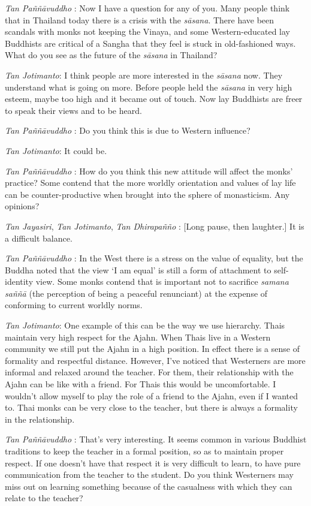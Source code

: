 \emph{Tan Paññāvuddho} : Now I have a question for any of you. Many
people think that in Thailand today there is a crisis with the
\emph{sāsana}. There have been scandals with monks not keeping the
Vinaya, and some Western-educated lay Buddhists are critical of a Sangha
that they feel is stuck in old-fashioned ways. What do you see as the
future of the \emph{sāsana} in Thailand?

\emph{Tan Jotimanto}: I think people are more interested in the
\emph{sāsana} now. They understand what is going on more. Before people
held the \emph{sāsana} in very high esteem, maybe too high and it became
out of touch. Now lay Buddhists are freer to speak their views and to be
heard.

\emph{Tan Paññāvuddho} : Do you think this is due to Western influence?

\emph{Tan Jotimanto}: It could be.

\emph{Tan Paññāvuddho} : How do you think this new attitude will affect
the monks' practice? Some contend that the more worldly orientation and
values of lay life can be counter-productive when brought into the
sphere of monasticism. Any opinions?

\emph{Tan Jayasiri}, \emph{Tan Jotimanto}, \emph{Tan Dhirapañño} :
{[}Long pause, then laughter.{]} It is a difficult balance.

\emph{Tan Paññāvuddho} : In the West there is a stress on the value of
equality, but the Buddha noted that the view `I am equal' is still a
form of attachment to self-identity view. Some monks contend that is
important not to sacrifice \emph{samana saññā} (the perception of being
a peaceful renunciant) at the expense of conforming to current worldly
norms.

\emph{Tan Jotimanto}: One example of this can be the way we use
hierarchy. Thais maintain very high respect for the Ajahn. When Thais
live in a Western community we still put the Ajahn in a high position.
In effect there is a sense of formality and respectful distance.
However, I've noticed that Westerners are more informal and relaxed
around the teacher. For them, their relationship with the Ajahn can be
like with a friend. For Thais this would be uncomfortable. I wouldn't
allow myself to play the role of a friend to the Ajahn, even if I wanted
to. Thai monks can be very close to the teacher, but there is always a
formality in the relationship.

\emph{Tan Paññāvuddho} : That's very interesting. It seems common in
various Buddhist traditions to keep the teacher in a formal position, so
as to maintain proper respect. If one doesn't have that respect it is
very difficult to learn, to have pure communication from the teacher to
the student. Do you think Westerners may miss out on learning something
because of the casualness with which they can relate to the teacher?

